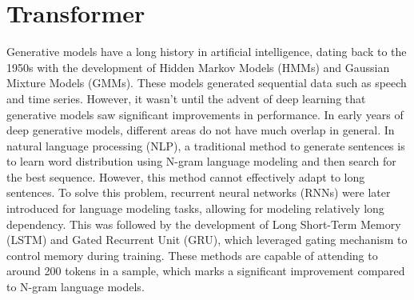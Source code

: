 \documentclass[conference]{IEEEtran}
\begin{document}
\section{Transformer}
\par Generative models have a long history in artificial intelligence, dating back to the 1950s with the
development of Hidden Markov Models (HMMs)\cite{b7} and Gaussian Mixture Models (GMMs)\cite{b8}.
These models generated sequential data such as speech and time series. However, it wasn’t until
the advent of deep learning that generative models saw significant improvements in performance.
In early years of deep generative models, different areas do not have much overlap in general.
In natural language processing (NLP), a traditional method to generate sentences is to learn
word distribution using N-gram language modeling\cite{b9} and then search for the best sequence.
However, this method cannot effectively adapt to long sentences. To solve this problem, recurrent
neural networks (RNNs)\cite{b10} were later introduced for language modeling tasks, allowing for
modeling relatively long dependency. This was followed by the development of Long Short-Term
Memory (LSTM)\cite{b11} and Gated Recurrent Unit (GRU)\cite{b12}, which leveraged gating mechanism to
control memory during training. These methods are capable of attending to around 200 tokens in a
sample\cite{b13}, which marks a significant improvement compared to N-gram language models.
\end{document}
